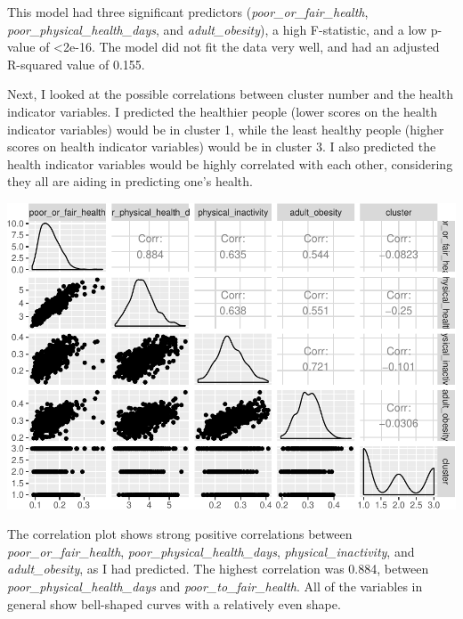 \documentclass[12pt,twoside]{amherstthesis}
\begin{document}
  This model had three significant predictors
  (\emph{poor\_or\_fair\_health}, \emph{poor\_physical\_health\_days}, and
  \emph{adult\_obesity}), a high F-statistic, and a low p-value of
  \textless{}2e-16. The model did not fit the data very well, and had an
  adjusted R-squared value of 0.155.
  
  Next, I looked at the possible correlations between cluster number and
  the health indicator variables. I predicted the healthier people (lower
  scores on the health indicator variables) would be in cluster 1, while
  the least healthy people (higher scores on health indicator variables)
  would be in cluster 3. I also predicted the health indicator variables
  would be highly correlated with each other, considering they all are
  aiding in predicting one's health.
  
  \begin{Shaded}
  \begin{Highlighting}[]
  \end{Highlighting}
  \end{Shaded}
  
  \begin{center}\includegraphics{Comps_Proj_files/figure-latex/unnamed-chunk-18-1} \end{center}
  
  The correlation plot shows strong positive correlations between
  \emph{poor\_or\_fair\_health}, \emph{poor\_physical\_health\_days},
  \emph{physical\_inactivity}, and \emph{adult\_obesity}, as I had
  predicted. The highest correlation was 0.884, between
  \emph{poor\_physical\_health\_days} and \emph{poor\_to\_fair\_health}.
  All of the variables in general show bell-shaped curves with a
  relatively even shape.
  
\end{document}
